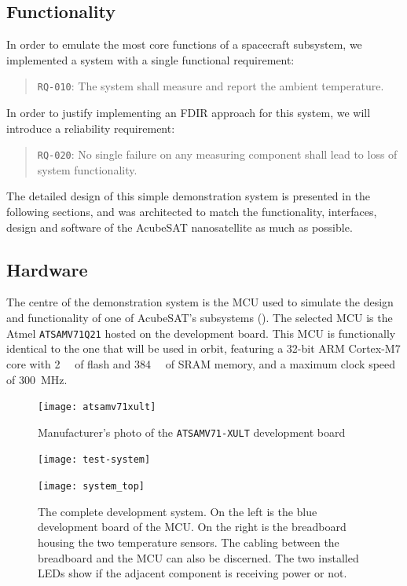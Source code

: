 \documentclass[a4paper,nobib]{tufte-book}
\begin{document}
\subsection{Functionality}
\label{sec:tsvcd}

In order to emulate the most core functions of a spacecraft subsystem, we implemented a system with a single functional requirement:
\begin{quote}
	\texttt{RQ-010}: The system shall measure and report the ambient temperature.
\end{quote}

In order to justify implementing an \ac{FDIR} approach for this system, we will introduce a reliability requirement:
\begin{quote}
	\texttt{RQ-020}: No single failure on any measuring component shall lead to loss of system functionality.
\end{quote}

The detailed design of this simple demonstration system is presented in the following sections, and was architected to match the functionality, interfaces, design and software of the AcubeSAT nanosatellite as much as possible.

\subsection{Hardware}

The centre of the demonstration system is the \ac{MCU} used to simulate the design and functionality of one of AcubeSAT's subsystems (). The selected \ac{MCU} is the Atmel \texttt{ATSAMV71Q21} hosted on the  development board. This \ac{MCU} is functionally identical to the one that will be used in orbit, featuring a 32-bit ARM Cortex-M7 core with \SI{2}{\mebi\byte} of flash and \SI{384}{\kibi\byte} of \acs{SRAM} memory, and a maximum clock speed of \SI{300}{\mega\hertz}.

\begin{figure}
	\centering
	\texttt{[image: atsamv71xult]}
	\caption{Manufacturer's photo of the \texttt{ATSAMV71-XULT} development board}
\end{figure}

\begin{figure}
	\texttt{[image: test-system]}\par
	\vspace*{3ex}
	\texttt{[image: system\_top]}
	\caption[The complete development system]{The complete development system. On the left is the blue development board of the \acs{MCU}. On the right is the breadboard housing the two temperature sensors. The cabling between the breadboard and the \acs{MCU} can also be discerned. The two installed \acsp{LED} show if the adjacent component is receiving power or not.}
\end{figure}
\end{document}
